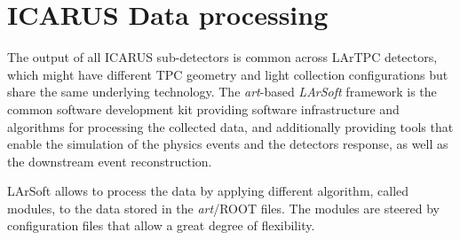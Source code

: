 

\section{ICARUS Data processing}

The output of all ICARUS sub-detectors is common across LArTPC detectors, which might have different TPC geometry and light collection configurations but share the same underlying technology. The \emph{art}-based \emph{LArSoft} framework \cite{Church:2013hea,Snider:2017wjd,Pordes:2017BL} is the common software development kit providing software infrastructure and algorithms for processing the collected data, and additionally providing tools that enable the simulation of the physics events and the detectors response, as well as the downstream event reconstruction. 

LArSoft allows to process the data by applying different algorithm, called modules, to the data stored in the \emph{art}/ROOT files. The modules are steered by configuration files that allow a great degree of flexibility. 

